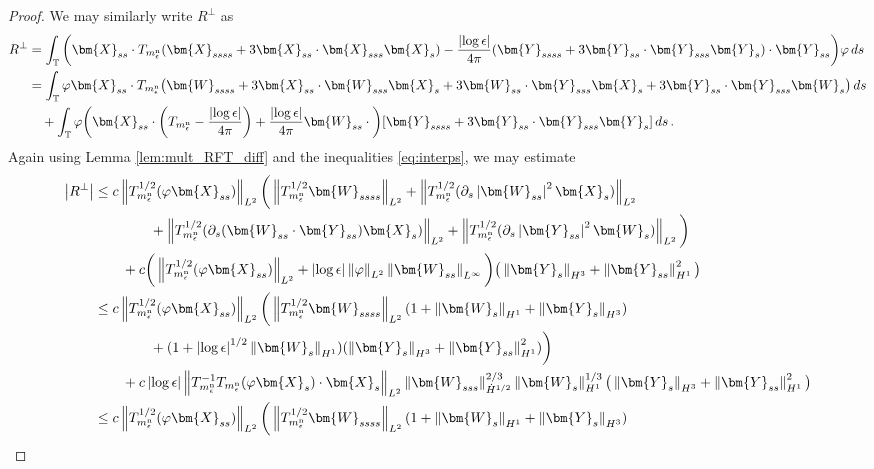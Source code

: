 \documentclass[11pt,reqno]{amsart}
\newcommand{\T}{\mathbb{T}}
\newcommand{\X}{\bm{X}}
\newcommand{\Y}{\bm{Y}}
\newcommand{\p}{\partial}
\newcommand{\abs}[1]{\left\lvert #1 \right\rvert}
\newcommand{\norm}[1]{\left\lVert #1 \right\rVert}
\numberwithin{equation}{section}
\theoremstyle{definition}
\begin{document}
\begin{proof}
We may similarly write $R^\perp$ as 
\begin{equation}
\begin{aligned}
  R^\perp &= \int_\T \bigg(\X_{ss}\cdot T_{m_\epsilon^{\rm n}}(\X_{ssss}+3\X_{ss}\cdot\X_{sss}\X_s) - \frac{\abs{\log\epsilon}}{4\pi}(\Y_{ssss}+3\Y_{ss}\cdot\Y_{sss}\Y_s)\cdot\Y_{ss} \bigg)\varphi\,ds \\
  &= \int_\T \varphi\X_{ss}\cdot T_{m_\epsilon^{\rm n}}\big(\bm{W}_{ssss}+3\X_{ss}\cdot\bm{W}_{sss}\X_s +3\bm{W}_{ss}\cdot\Y_{sss}\X_s +3\Y_{ss}\cdot\Y_{sss}\bm{W}_s\big)\,ds\\
  &\quad +\int_\T \varphi\bigg(\X_{ss}\cdot\bigg(T_{m_\epsilon^{\rm n}}-\frac{\abs{\log\epsilon}}{4\pi}\bigg)+ \frac{\abs{\log\epsilon}}{4\pi}\bm{W}_{ss}\cdot \bigg)[\Y_{ssss}+3\Y_{ss}\cdot\Y_{sss}\Y_s] \,ds\,.
\end{aligned}
\end{equation}
%
%
Again using Lemma \ref{lem:mult_RFT_diff} and the inequalities \eqref{eq:interps}, we may estimate 
\begin{equation}
\begin{aligned}
  \abs{R^\perp} &\le c\norm{T_{m_\epsilon^{\rm n}}^{1/2}(\varphi\X_{ss})}_{L^2}\bigg(\norm{T_{m_\epsilon^{\rm n}}^{1/2}\bm{W}_{ssss}}_{L^2}+\norm{T_{m_\epsilon^{\rm n}}^{1/2}(\p_s\abs{\bm{W}_{ss}}^2\X_s)}_{L^2}\\
  &\qquad\qquad  +\norm{T_{m_\epsilon^{\rm n}}^{1/2}(\p_s(\bm{W}_{ss}\cdot\Y_{ss})\X_s)}_{L^2} +\norm{T_{m_\epsilon^{\rm n}}^{1/2}(\p_s\abs{\Y_{ss}}^2\bm{W}_s)}_{L^2}\bigg) \\
  &\qquad +c\bigg(\norm{T_{m_\epsilon^{\rm n}}^{1/2}(\varphi\X_{ss})}_{L^2}+ \abs{\log\epsilon}\norm{\varphi}_{L^2}\norm{\bm{W}_{ss}}_{L^\infty}\bigg)\big( \norm{\Y_s}_{H^3}+ \norm{\Y_{ss}}_{H^1}^2\big) \\
  &\le c\norm{T_{m_\epsilon^{\rm n}}^{1/2}(\varphi\X_{ss})}_{L^2}\bigg(\norm{T_{m_\epsilon^{\rm n}}^{1/2}\bm{W}_{ssss}}_{L^2}(1+\norm{\bm{W}_s}_{H^1}+\norm{\Y_s}_{H^3}) \\
  &\qquad\qquad +(1+\abs{\log\epsilon}^{1/2}\norm{\bm{W}_s}_{H^1})(\norm{\Y_s}_{H^3}+\norm{\Y_{ss}}_{H^1}^2) \bigg) \\
  &\qquad + c\abs{\log\epsilon}\norm{T_{m_\epsilon^{\rm n}}^{-1}T_{m_\epsilon^{\rm n}}(\varphi\X_s)\cdot\X_s}_{L^2}\norm{\bm{W}_{sss}}_{\dot H^{1/2}}^{2/3}\norm{\bm{W}_s}_{H^1}^{1/3}\big( \norm{\Y_s}_{H^3}+ \norm{\Y_{ss}}_{H^1}^2\big)\\
   &\le c\norm{T_{m_\epsilon^{\rm n}}^{1/2}(\varphi\X_{ss})}_{L^2}\bigg(\norm{T_{m_\epsilon^{\rm n}}^{1/2}\bm{W}_{ssss}}_{L^2}(1+\norm{\bm{W}_s}_{H^1}+\norm{\Y_s}_{H^3}) \\

\end{aligned}
\end{equation}
\end{proof}
\end{document}
